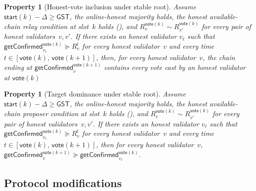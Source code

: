 \documentclass{article}
\newcommand{\start}{\mathsf{start}}
\newcommand{\vote}{\mathsf{vote}}
\newcommand{\getConfirmed}{\textsf{getConfirmed}\xspace}
\theoremstyle{plain}
\newtheorem{property}[theorem]{Property}
\theoremstyle{definition}
\theoremstyle{remark}
\newcommand{\GST}{\ensuremath{\mathsf{GST}}}
\newcommand{\OHM}{online-honest majority\xspace}
\newcommand{\HAP}{honest available-chain proposer\xspace}
\newcommand{\HAR}{honest available-chain relay\xspace}
\begin{document}
\begin{property}[Honest-vote inclusion under stable root]\label{rev:prop:honest-vote-inclusion}
Assume $\start(k) - \Delta \geq \GST$, the \OHM holds, the \HAR condition at slot~$k$ holds (), and $R_v^{\vote(k)} \sim R_{v'}^{\vote(k)}$ for every pair of honest validators~$v, v'$.
If there exists an honest validator $v_\ell$ such that
$\getConfirmed_{v_\ell}^{\vote(k)}\succeq R_{v}^t$ for every honest validator~$v$ and every time $t \in [\vote(k),\, \vote(k+1)]$, then,
for every honest validator~$v$, the chain ending at $\getConfirmed_v^{\vote(k+1)}$ contains every vote cast by an honest validator at $\vote(k)$
\end{property}


\begin{property}[Target dominance under stable root]\label{rev:prop:target-dominance}
Assume $\start(k) - \Delta \geq \GST$, the \OHM holds, the \HAP condition at slot~$k$ holds (), and $R_v^{\vote(k)} \sim R_{v'}^{\vote(k)}$ for every pair of honest validators~$v, v'$.
If there exists an honest validator $v_\ell$ such that $\getConfirmed_{v_\ell}^{\vote(k)} \succeq R_{v}^t$ for every honest validator~$v$ and every time $t \in [\vote(k),\, \vote(k+1)]$, then for every honest validator~$v$, $\getConfirmed_v^{\vote(k+1)} \succeq \getConfirmed_{v_\ell}^{\vote(k)}$.
\end{property}

\subsection{Protocol modifications}\label{rev:sec:healing-protocol}
\end{document}
